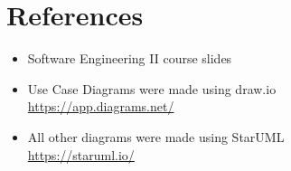 \section{References}
\begin{itemize}
    \item Software Engineering II course slides
    \item Use Case Diagrams were made using draw.io\\ \url{https://app.diagrams.net/}
    \item All other diagrams were made using StarUML\\ \url{https://staruml.io/}
\end{itemize}
